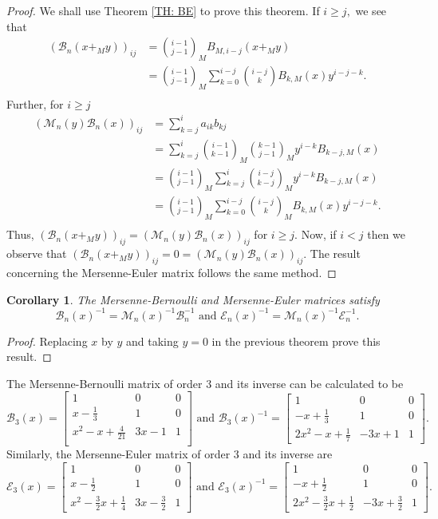 \documentclass[12pt, a4paper]{article}
\newtheorem{corollary}[theorem]{Corollary}
\begin{document}
\begin{proof}
We shall use Theorem \ref{TH: BE} to prove this theorem. 
If $i \geq j,$ we see that
\begin{align*}
\left(\mathcal{B}_n(x+_My)\right)_{ij} &= \binom{i-1}{j-1}_MB_{M,i-j}(x+_My)\\
&= \binom{i-1}{j-1}_M\sum_{k=0}^{i-j}\binom{i-j}{k}B_{k,M}(x)y^{i-j-k}.\\
\end{align*}
Further, for $i \geq j$
\begin{align*}
\left(\mathcal{M}_n(y)\mathcal{B}_n(x)\right)_{ij}&= \sum_{k=j}^{i}a_{ik}b_{kj}\\
&= \sum_{k=j}^{i}\binom{i-1}{k-1}_M\binom{k-1}{j-1}_My^{i-k}B_{k-j,M}(x)\\
&= \binom{i-1}{j-1}_M\sum_{k=j}^{i}\binom{i-j}{k-j}_My^{i-k}B_{k-j,M}(x)\\
&= \binom{i-1}{j-1}_M\sum_{k=0}^{i-j}\binom{i-j}{k}_MB_{k,M}(x)y^{i-j-k}.\\
\end{align*}
Thus, $\left(\mathcal{B}_n(x+_My)\right)_{ij} = \left(\mathcal{M}_n(y)\mathcal{B}_n(x)\right)_{ij}$ for $i \geq j.$ Now, if $i < j$
then we observe that $\left(\mathcal{B}_n(x+_My)\right)_{ij} = 0 = \left(\mathcal{M}_n(y)\mathcal{B}_n(x)\right)_{ij}.$
The result concerning the Mersenne-Euler matrix follows the same method.
\end{proof}
\begin{corollary}
The Mersenne-Bernoulli and Mersenne-Euler matrices satisfy 
\[\mathcal{B}_n(x)^{-1} = \mathcal{M}_n(x)^{-1}\mathcal{B}_n^{-1} \text{~and~} \mathcal{E}_n(x)^{-1} = \mathcal{M}_n(x)^{-1}\mathcal{E}_n^{-1}.\]
\end{corollary}
\begin{proof}
Replacing $x$ by $y$ and taking $y = 0$ in the previous theorem prove this result.
\end{proof}
\noindent The Mersenne-Bernoulli matrix of order $3$ and its inverse can be calculated to be
\[\mathcal{B}_3(x) = 
\begin{bmatrix}
1 & 0 & 0\\
x-\frac{1}{3} & 1 & 0\\
x^2 - x + \frac{4}{21} & 3x - 1 & 1\\
\end{bmatrix} \text{~and~}
\mathcal{B}_3(x)^{-1} =
\begin{bmatrix}
1 & 0 & 0 \\
-x+\frac{1}{3} & 1 & 0 \\
2x^2-x+\frac{1}{7} & -3x+1 & 1
\end{bmatrix}.\]
Similarly, the Mersenne-Euler matrix of order $3$ and its inverse are
\[\mathcal{E}_3(x) =
\begin{bmatrix}
1 & 0 & 0 \\
x-\frac{1}{2} & 1 & 0 \\
x^2-\frac{3}{2}x+\frac{1}{4} & 3x-\frac{3}{2} & 1 
\end{bmatrix}
\text{~and~}
\mathcal{E}_3(x)^{-1} =
\begin{bmatrix}
1 & 0 & 0\\
-x+\frac{1}{2} & 1 & 0\\
2x^2-\frac{3}{2}x+\frac{1}{2} & -3x+\frac{3}{2} & 1
\end{bmatrix}.
\]
\end{document}
